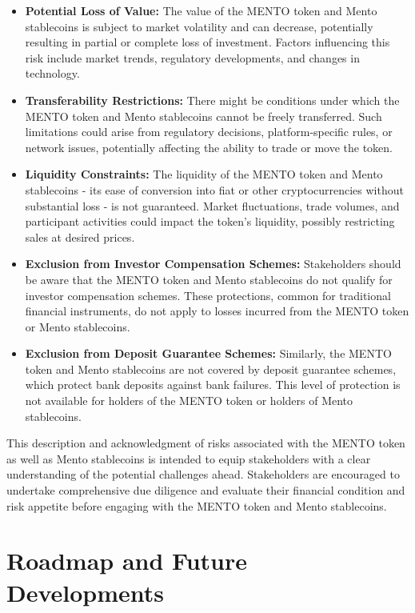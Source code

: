 \documentclass[a4paper]{article}
\theoremstyle{definition}
\begin{document}
\begin{itemize}
    \item \textbf{Potential Loss of Value:} The value of the MENTO token and Mento stablecoins is subject to market volatility and can decrease, potentially resulting in partial or complete loss of investment. Factors influencing this risk include market trends, regulatory developments, and changes in technology.
    
    \item \textbf{Transferability Restrictions:} There might be conditions under which the MENTO token and Mento stablecoins cannot be freely transferred. Such limitations could arise from regulatory decisions, platform-specific rules, or network issues, potentially affecting the ability to trade or move the token.
    
    \item \textbf{Liquidity Constraints:} The liquidity of the MENTO token and Mento stablecoins - its ease of conversion into fiat or other cryptocurrencies without substantial loss - is not guaranteed. Market fluctuations, trade volumes, and participant activities could impact the token's liquidity, possibly restricting sales at desired prices.
    
    \item \textbf{Exclusion from Investor Compensation Schemes:} Stakeholders should be aware that the MENTO token and Mento stablecoins do not qualify for investor compensation schemes. These protections, common for traditional financial instruments, do not apply to losses incurred from the MENTO token or Mento stablecoins.
    
    \item \textbf{Exclusion from Deposit Guarantee Schemes:} Similarly, the MENTO token and Mento stablecoins are not covered by deposit guarantee schemes, which protect bank deposits against bank failures. This level of protection is not available for holders of the MENTO token or holders of Mento stablecoins.
\end{itemize}

This description and acknowledgment of risks associated with the MENTO token as well as Mento stablecoins is intended to equip stakeholders with a clear understanding of the potential challenges ahead. Stakeholders are encouraged to undertake comprehensive due diligence and evaluate their financial condition and risk appetite before engaging with the MENTO token and Mento stablecoins.

\section{Roadmap and Future Developments}
\label{sec:roadmap}
\end{document}
